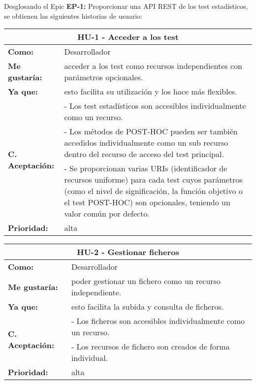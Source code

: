 Desglosando el Epic \textbf{EP-1:} Proporcionar una API REST de los test estadísticos, se obtienen las siguientes historias de usuario:

\begin{table}[H]
	\begin{tabular}{| p{3cm}| p{11cm} |}
		\hline
		\multicolumn{2}{|c|}{\textbf{HU-1} - Acceder a los test} \\ \hline
		\textbf{Como:} & Desarrollador \\ \hline
		\textbf{Me gustaría:} & acceder a los test como recursos independientes con parámetros opcionales. \\ \hline
		\textbf{Ya que:} & esto facilita su utilización y los hace más flexibles. \\ \hline
		\multirow{3}{11cm}{\textbf{C. Aceptación:}} & - Los test estadísticos son accesibles individualmente como un recurso. \\
		& - Los métodos de POST-HOC pueden ser también accedidos individualmente como un sub recurso dentro del recurso de acceso del test principal. \\
		& - Se proporcionan varias URIs (identificador de recursos uniforme) para cada test cuyos parámetros (como el nivel de significación, la función objetivo o el test POST-HOC) son opcionales, teniendo un valor común por defecto. \\ \hline
		\textbf{\textbf{Prioridad:}} & alta \\ \hline
	\end{tabular}
\end{table}


\begin{table}[H]
	\begin{tabular}{| p{3cm}| p{11cm} |}
		\hline
		\multicolumn{2}{|c|}{\textbf{HU-2} - Gestionar ficheros} \\ \hline
		\textbf{Como:} & Desarrollador \\ \hline
		\textbf{Me gustaría:} & poder gestionar un fichero como un recurso independiente. \\ \hline
		\textbf{Ya que:} & esto facilita la subida y consulta de ficheros. \\ \hline
		\multirow{2}{11cm}{\textbf{C. Aceptación:}} & - Los ficheros son accesibles individualmente como un recurso. \\
		& - Los recursos de fichero son creados de forma individual. \\ \hline 
		\textbf{\textbf{Prioridad:}} & alta \\ \hline
	\end{tabular}
\end{table}
	
